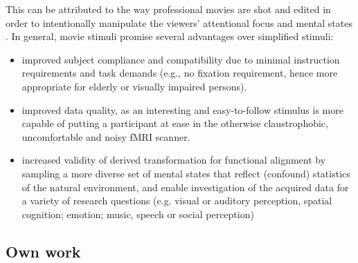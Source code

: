 %
This can be attributed to the way professional movies are shot and edited in
order to intentionally manipulate the viewers' attentional focus and mental
states \citep{brown2012cinematography, dancyger2011film-technique}.
%
In general, movie stimuli promise several advantages over simplified stimuli:
\begin{itemize}
    \item improved subject compliance and compatibility due to
            minimal instruction requirements and task demands (e.g., no fixation
            requirement, hence more appropriate for elderly or visually impaired
        persons).
    \item improved data quality, as an interesting and
            easy-to-follow stimulus is more capable of putting a participant at
            ease in the otherwise claustrophobic, uncomfortable and noisy fMRI
        scanner.
    \item increased validity of derived transformation for
            functional alignment by sampling a more diverse set of mental states
            that reflect (confound) statistics of the natural environment, and
            enable investigation of the acquired data for a variety of research
            questions (e.g. visual or auditory perception, spatial cognition;
            emotion; music, speech or social perception)
\end{itemize}


\subsection{Own work}

